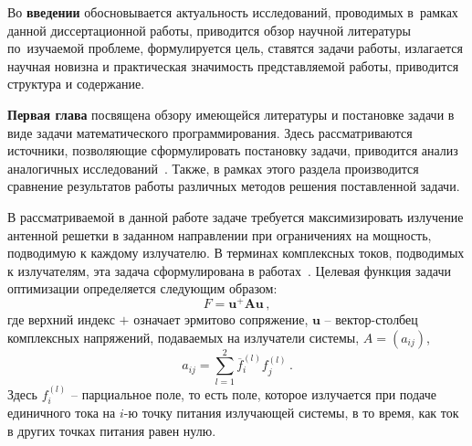 Во {\textbf{введении}} обосновывается актуальность
исследований, проводимых в~рамках данной диссертационной работы,
приводится обзор научной литературы по~изучаемой проблеме,
формулируется цель, ставятся задачи работы, излагается научная новизна
и практическая значимость представляемой работы, приводится структура и содержание.

{\textbf{Первая глава}} посвящена обзору имеющейся литературы и постановке задачи в виде задачи математического программирования. Здесь рассматриваются источники, позволяющие сформулировать постановку задачи, приводится анализ аналогичных 
исследований~. Также, в рамках этого раздела производится сравнение результатов работы различных методов решения поставленной задачи.

В рассматриваемой в данной работе задаче требуется максимизировать излучение антенной решетки в заданном направлении при ограничениях на мощность, подводимую к каждому излучателю. В терминах комплексных токов, подводимых к излучателям, эта задача сформулирована в работах~. Целевая функция задачи оптимизации определяется следующим образом:
%
    \begin{equation}
        F = \textbf{u}^{+}\textbf{Au} \, ,
        \label{eq:F_0}
    \end{equation}
%
где верхний индекс $+$ означает эрмитово сопряжение, $\textbf{u}$ -- вектор-столбец комплексных напряжений, подаваемых на излучатели системы, $A = (a_{ij})$,
%
     \begin{equation}
        a_{ij} = \sum_{l=1}^2\overline{f}_{i}^{(l)}f_{j}^{(l)}
        \label{eq:A_0} \, .
    \end{equation}
%
Здесь $f_i^{(l)}$ -- парциальное поле, то есть поле, которое излучается при подаче единичного тока на $i$-ю точку питания излучающей системы, в то время, как ток в других точках питания равен нулю.

